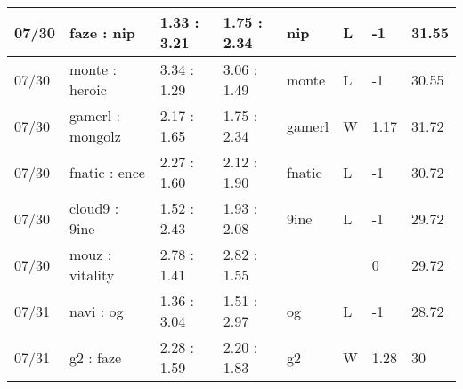 \begin{small}
\begin{longtable}{|l|l|l|l|l|l|l|l|}
	07/30                               & faze : nip                          & 1.33 : 3.21                             & 1.75 : 2.34                             & nip                               & L                                 & -1                                   & 31.55                             \\ \hline
	07/30                               & monte : heroic                      & 3.34 : 1.29                             & 3.06 : 1.49                             & monte                             & L                                 & -1                                   & 30.55                             \\ \hline
	07/30                               & gamerl : mongolz                    & 2.17 : 1.65                             & 1.75 : 2.34                             & gamerl                            & W                                 & 1.17                                 & 31.72                             \\ \hline
	07/30                               & fnatic : ence                       & 2.27 : 1.60                             & 2.12 : 1.90                             & fnatic                            & L                                 & -1                                   & 30.72                             \\ \hline
	07/30                               & cloud9 : 9ine                       & 1.52 : 2.43                             & 1.93 : 2.08                             & 9ine                              & L                                 & -1                                   & 29.72                             \\ \hline
	07/30                               & mouz : vitality                     & 2.78 : 1.41                             & 2.82 : 1.55                             &                                   &                                   & 0                                    & 29.72                             \\ \hline
	07/31                               & navi : og                           & 1.36 : 3.04                             & 1.51 : 2.97                             & og                                & L                                 & -1                                   & 28.72                             \\ \hline
	07/31                               & g2 : faze                           & 2.28 : 1.59                             & 2.20 : 1.83                             & g2                                & W                                 & 1.28                                 & 30                                \\ \hline

\end{longtable}
\end{small}
